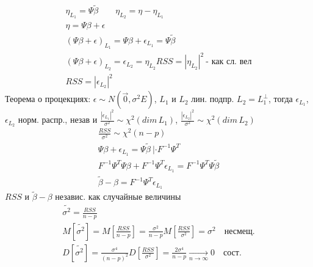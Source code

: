 \documentclass{article}
\begin{document}
  \begin{gather*}
    \eta_{L_1} = \Psi \tilde{\beta} \qquad \eta_{L_2} = \eta-\eta_{L_1} \\ 
    \eta = \Psi \beta + \epsilon \\ 
    (\Psi \beta + \epsilon)_{L_1} = \Psi \beta + \epsilon_{L_1} = \Psi \tilde{\beta} \\ 
    (\Psi \beta + \epsilon)_{L_2} = \epsilon_{L_2}=\eta_{L_2}
    RSS = |\eta_{L_2}|^{2} \ \text{- как сл. вел} \\ 
    RSS=|\epsilon_{L_2}|^{2}
  \end{gather*}
  Теорема о процекциях: $\epsilon \sim N(\vec{0}, \sigma^{2} E)$, $L_1$ и $L_2$ лин. подпр.
  $L_2 = L_1^{\perp}$, тогда $\epsilon_{L_1}$, $\epsilon_{L_2}$ норм. распр., незав
  и $\frac{|\epsilon_{L_1}|^{2}}{\sigma^{2}} \sim \chi^{2}(dim \, L_1)$,
  $\frac{|\epsilon_{L_2}|^{2}}{\sigma^{2}} \sim \chi^{2}(dim \, L_2)$
  \begin{gather*}
    \frac{RSS}{\sigma^{2}} \sim \chi^{2}(n-p) \\ 
    \Psi \beta + \epsilon_{L_1}=\Psi \tilde{\beta} \ |\cdot F^{-1}\Psi^{T} \\ 
  F^{-1}\Psi^{T}\Psi \beta + F^{-1}\Psi^{T}\epsilon_{L_1}=F^{-1}\Psi^{T}\Psi \tilde{\beta} \\ 
  \tilde{\beta} - \beta = F^{-1}\Psi^{T}\epsilon_{L_1}
  \end{gather*}
  $RSS$ и $\tilde{\beta}-\beta$ независ. как случайные величины
  \begin{gather*}
    \tilde{\sigma^{2}}=\frac{RSS}{n-p} \\ 
    M[\tilde{\sigma^{2}}]=M[\frac{RSS}{n-p}]=\frac{\sigma^{2}}{n-p}M[\frac{RSS}{\sigma^{2}}]=\sigma^{2} \quad \text{несмещ.} \\ 
  D[\tilde{\sigma^{2}}]=\frac{\sigma^{4}}{(n-p)^{2}}D[\frac{RSS}{\sigma^{2}}]=\frac{2\sigma^{4}}{n-p} \underset{n\to\infty}{\to} 0 \quad \text{сост.}
  \end{gather*}
\end{document}
